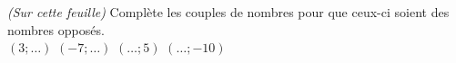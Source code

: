 %
%
	\emph{(Sur cette feuille)} Complète les couples de nombres pour que ceux-ci soient des nombres opposés. \\

	\((3; \ldots )\) \hfill \((-7 ; \ldots )\) \hfill \((\ldots ; 5)\) \hfill \((\ldots ; -10)\)

